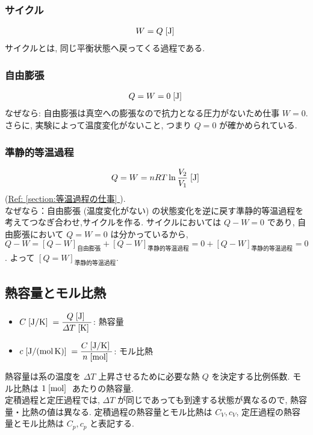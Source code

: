 \documentclass[a4paper,11pt]{jsarticle}
\newcommand{\braunit}[1]{\;\text{[}\unit[per-mode = symbol]{#1}\text{]}\;}
\newcommand*{\fullref}[1]{\hyperref[{#1}]{Ref: \ref*{#1} \nameref*{#1}}} %
\begin{document}
\subsubsection{サイクル} \label{section:熱力学第1法則_サイクル}
\begin{align*}
  W = Q\braunit{\J}
\end{align*}
サイクルとは, 同じ平衡状態へ戻ってくる過程である.
\cite[pp.34]{thermo}
\subsubsection{自由膨張}
\begin{align*}
  Q = W = 0\braunit{\J}
\end{align*}
なぜなら: 自由膨張は真空への膨張なので抗力となる圧力がないため仕事 $W=0$.
さらに, 実験によって温度変化がないこと, つまり $Q=0$ が確かめられている.
\cite[pp.53]{thermo}
\subsubsection{準静的等温過程} \label{section:熱力学第1法則_準静的等温過程}
\begin{align*}
  Q = W = nRT\ln\frac{V_2}{V_1}\braunit{\J}
\end{align*}
(\fullref{section:等温過程の仕事}).\\
なぜなら：自由膨張 (温度変化がない) の状態変化を逆に戻す準静的等温過程を考えてつなぎ合わせ,サイクルを作る.
サイクルにおいては $Q - W = 0$ であり, 自由膨張において $Q = W = 0$ は分かっているから,
$Q - W = \left[Q - W\right]_{自由膨張} + \left[Q - W\right]_{準静的等温過程} = 0 + \left[Q - W\right]_{準静的等温過程} = 0$.
よって $\left[Q = W\right]_{準静的等温過程}$.
\cite[pp.56]{thermo}

\subsection{熱容量とモル比熱}
\begin{itemize}
  \item $C\braunit{\J\per\K} = \dfrac{Q\braunit{\J}}{\varDelta T\braunit{\K}}$: 熱容量
  \item $c\braunit{\J\per\mole\per\K} = \dfrac{C\braunit{\J\per\K}}{n\braunit{\mole}}$: モル比熱
\end{itemize}
熱容量は系の温度を $\varDelta T$ 上昇させるために必要な熱 $Q$ を決定する比例係数.
モル比熱は $1\braunit{\mole}$ あたりの熱容量.\\
定積過程と定圧過程では, $\varDelta T$ が同じであっても到達する状態が異なるので, 熱容量・比熱の値は異なる.
定積過程の熱容量とモル比熱は $C_V, c_V$, 定圧過程の熱容量とモル比熱は $C_p, c_p$ と表記する.
\cite[pp.38]{thermo}
\end{document}
